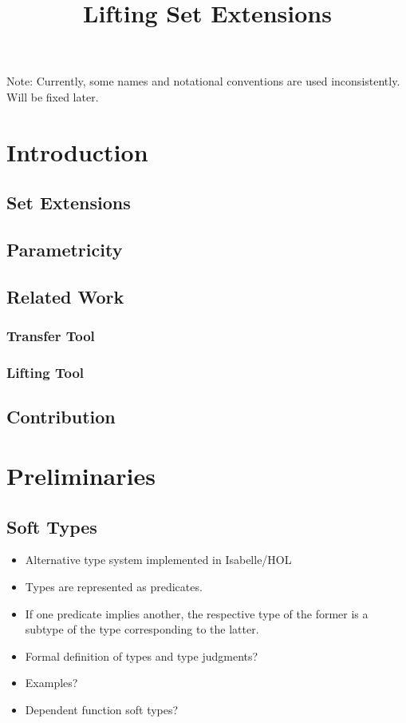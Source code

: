 \documentclass[]{article}
\title{Lifting Set Extensions}
\date{}
\author{}
\theoremstyle{definition}
\begin{document}
	
\maketitle
\begin{abstract}
	
\end{abstract}

Note: Currently, some names and notational conventions are used inconsistently. Will be fixed later.

\section{Introduction}

\subsection{Set Extensions}

\subsection{Parametricity}

\subsection{Related Work}
\subsubsection{Transfer Tool}

\subsubsection{Lifting Tool}

\subsection{Contribution}

\section{Preliminaries}

\subsection{Soft Types}
\begin{itemize}
	\item Alternative type system implemented in Isabelle/HOL
	\item Types are represented as predicates.
	\item If one predicate implies another, the respective type of the former is a subtype of the type corresponding to the latter.
	\item Formal definition of types and type judgments?
	\item Examples?
	\item Dependent function soft types?
\end{itemize}
\end{document}
